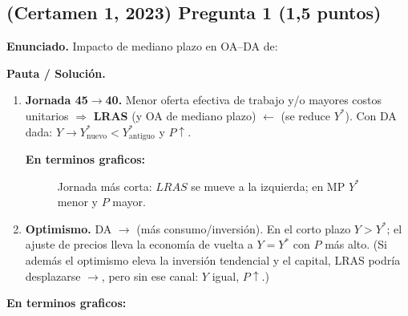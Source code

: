 \documentclass[11pt,addpoints]{article}
\begin{document}
\subsection*{(Certamen 1, 2023) \quad Pregunta 1 (1,5 puntos)}
\textbf{Enunciado.} Impacto de mediano plazo en OA--DA de:

\textbf{Pauta / Solución.}
\begin{enumerate}[label=\alph*)]
\item \textbf{Jornada 45$\to$40.} Menor oferta efectiva de trabajo y/o mayores costos unitarios \(\Rightarrow\) \textbf{LRAS} (y OA de mediano plazo) \(\leftarrow\) (se reduce \(Y^*\)). Con DA dada: \(\boxed{Y \to Y^{*}_{\text{nuevo}}<Y^{*}_{\text{antiguo}}}\) y \(\boxed{P\uparrow}\).

\newpage
\vspace*{0.2cm}
\textbf{En terminos graficos:}

\begin{figure}[h!]
\centering
{}
\caption{Jornada más corta: $LRAS$ se mueve a la izquierda; en MP $Y^*$ menor y $P$ mayor.}
\end{figure}


\item \textbf{Optimismo.} DA \(\rightarrow\) (más consumo/inversión). En el corto plazo \(Y>Y^*\); el ajuste de precios lleva la economía de vuelta a \(\boxed{Y=Y^*}\) con \(\boxed{P}\) más alto. (Si además el optimismo eleva la inversión tendencial y el capital, LRAS podría desplazarse \(\rightarrow\), pero sin ese canal: \(Y\) igual, \(P\uparrow\).)

\end{enumerate}
\textbf{En terminos graficos:}
\end{document}
